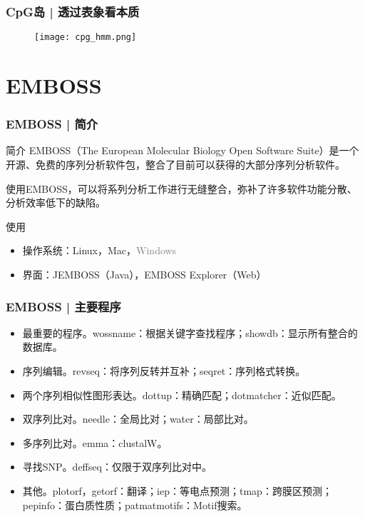 \begin{frame}
  \frametitle{CpG岛 | 透过表象看本质}
  \begin{figure}
    \centering
    \texttt{[image: cpg\_hmm.png]}
  \end{figure}
\end{frame}

\section{EMBOSS}
\begin{frame}
  \frametitle{EMBOSS | 简介}
  \begin{block}{简介}
    EMBOSS（The European Molecular Biology Open Software Suite）是一个开源、免费的序列分析软件包，整合了目前可以获得的大部分序列分析软件。

    使用EMBOSS，可以将系列分析工作进行无缝整合，弥补了许多软件功能分散、分析效率低下的缺陷。
  \end{block}
  \begin{block}{使用}
    \begin{itemize}
      \item 操作系统：Linux，Mac，\textcolor{gray}{Windows}
      \item 界面：JEMBOSS（Java），EMBOSS Explorer（Web）
    \end{itemize}
  \end{block}
\end{frame}

\begin{frame}
  \frametitle{EMBOSS | 主要程序}
  \begin{itemize}
    \item 最重要的程序。wossname：根据关键字查找程序；showdb：显示所有整合的数据库。
    \item 序列编辑。revseq：将序列反转并互补；seqret：序列格式转换。
    \item 两个序列相似性图形表达。dottup：精确匹配；dotmatcher：近似匹配。
    \item 双序列比对。needle：全局比对；water：局部比对。
    \item 多序列比对。emma：clustalW。
    \item 寻找SNP。deffseq：仅限于双序列比对中。
    \item 其他。plotorf，getorf：翻译；iep：等电点预测；tmap：跨膜区预测；pepinfo：蛋白质性质；patmatmotifs：Motif搜索。
  \end{itemize}
\end{frame}


